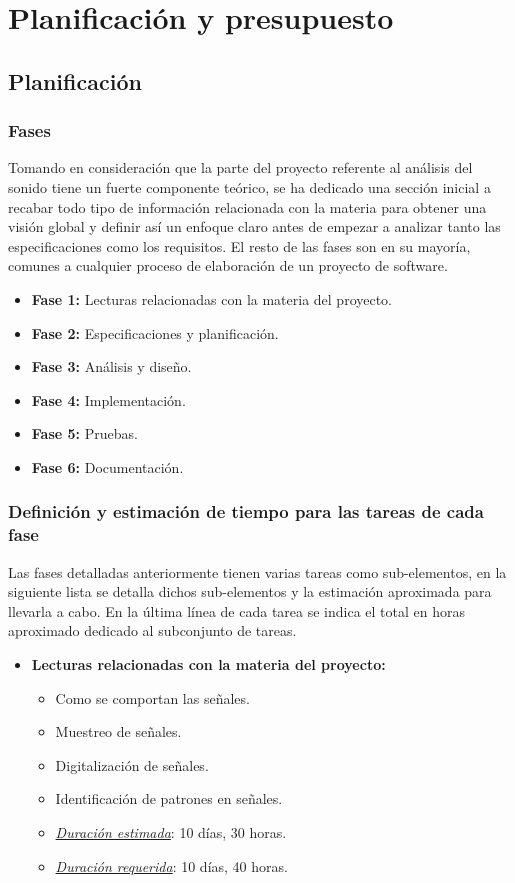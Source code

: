 \chapter{Planificación y presupuesto}

\section{Planificación}

\subsection{Fases}
Tomando en consideración que la parte del proyecto referente al análisis del sonido tiene un fuerte componente teórico, se ha dedicado una sección inicial a recabar todo tipo de información relacionada con la materia para obtener una visión global y definir así un enfoque claro antes de empezar a analizar tanto las especificaciones como los requisitos. El resto de las fases son en su mayoría, comunes a cualquier proceso de elaboración de un proyecto de software.

\begin{itemize}
  \item \textbf{Fase 1:} Lecturas relacionadas con la materia del proyecto.
  \item \textbf{Fase 2:} Especificaciones y planificación.
  \item \textbf{Fase 3:} Análisis y diseño.
  \item \textbf{Fase 4:} Implementación.
  \item \textbf{Fase 5:} Pruebas.
  \item \textbf{Fase 6:} Documentación.
\end{itemize}

\newpage
\subsection{Definición y estimación de tiempo para las tareas de cada fase}

Las fases detalladas anteriormente tienen varias tareas como sub-elementos, en la siguiente lista se detalla dichos sub-elementos y la estimación aproximada para llevarla a cabo. En la última línea de cada tarea se indica el total en horas aproximado dedicado al subconjunto de tareas.

\begin{itemize}
   \item \textbf{Lecturas relacionadas con la materia del proyecto:}
   \begin{itemize}
    \item Como se comportan las señales.
    \item Muestreo de señales.
    \item Digitalización de señales.
    \item Identificación de patrones en señales.
    \item \underline{\textit{Duración estimada}}: 10 días, 30 horas.
    \item \underline{\textit{Duración requerida}}: 10 días, 40 horas.
    \end{itemize}
\end{itemize}

